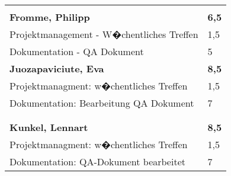 \documentclass[a4paper,11pt]{scrartcl}
\begin{document}
\begin{longtable}{| p{13.8cm} | C{2.4cm} |}

	&

	\\
	\hline


	&

	\\
	\hline
	\hline


	\textbf{Fromme, Philipp} & \textbf{6,5}\\ %
	\hline

	Projektmanagement - W�chentliches Treffen
	&
	1,5
	\\
	\hline

  Dokumentation - QA Dokument
	&
  5
	\\
  \hline
	\hline


	\textbf{Juozapaviciute, Eva} & \textbf{8,5}\\ %
	\hline

  Projektmanagment: w�chentliches Treffen
	&
  1,5
	\\
	\hline

  Dokumentation: Bearbeitung QA Dokument
	&
  7
	\\
	\hline


	&

	\\
	\hline


	&

	\\
	\hline
	\hline


	\textbf{Kunkel, Lennart} & \textbf{8,5}\\ %
	\hline

  Projektmanagment: w�chentliches Treffen
	&
  1,5
	\\
	\hline

  Dokumentation: QA-Dokument bearbeitet
	&
  7
	\\
	\hline


\end{longtable}
\end{document}
